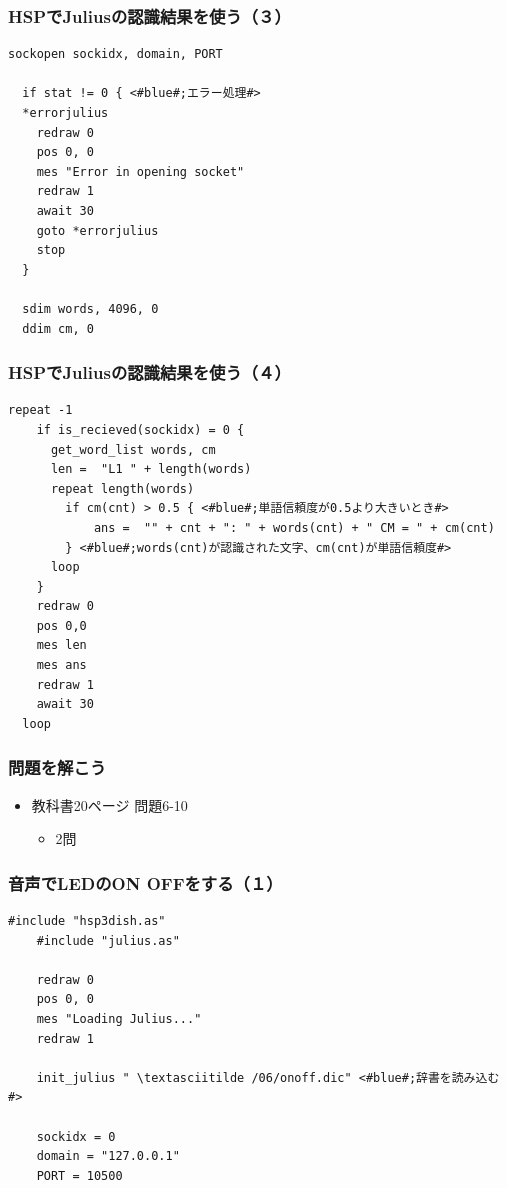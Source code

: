 \documentclass[14pt]{beamer}
\begin{document}
\begin{frame}[fragile]
  \frametitle{HSPでJuliusの認識結果を使う（３）}
  \begin{lstlisting}[caption=julius.hsp,label=julius.hsp]
  sockopen sockidx, domain, PORT

  if stat != 0 { <#blue#;エラー処理#>
  *errorjulius
    redraw 0
    pos 0, 0
    mes "Error in opening socket"
    redraw 1
    await 30
    goto *errorjulius
    stop
  }

  sdim words, 4096, 0
  ddim cm, 0
  \end{lstlisting}
\end{frame}

\begin{frame}[fragile]
  \frametitle{HSPでJuliusの認識結果を使う（４）}
  \begin{lstlisting}[caption=julius.hsp,label=julius.hsp,basicstyle=\scriptsize]
  repeat -1
    if is_recieved(sockidx) = 0 {
      get_word_list words, cm
      len =  "L1 " + length(words)
      repeat length(words)
        if cm(cnt) > 0.5 { <#blue#;単語信頼度が0.5より大きいとき#>
            ans =  "" + cnt + ": " + words(cnt) + " CM = " + cm(cnt)
        } <#blue#;words(cnt)が認識された文字、cm(cnt)が単語信頼度#>
      loop
    }
    redraw 0
    pos 0,0
    mes len
    mes ans
    redraw 1
    await 30
  loop
  \end{lstlisting}
\end{frame}

\begin{frame}
  \frametitle{問題を解こう}
  \begin{itemize}
    \item 教科書20ページ 問題6-10
          \begin{itemize}
            \item 2問
          \end{itemize}
  \end{itemize}
\end{frame}

\begin{frame}[fragile]
  \frametitle{音声でLEDのON OFFをする（１）}
  \begin{lstlisting}[caption=ledvoice.hsp,label=ledvoice.hsp]
    #include "hsp3dish.as"
    #include "julius.as"

    redraw 0
    pos 0, 0
    mes "Loading Julius..."
    redraw 1

    init_julius " \textasciitilde /06/onoff.dic" <#blue#;辞書を読み込む#>

    sockidx = 0
    domain = "127.0.0.1"
    PORT = 10500
  \end{lstlisting}
\end{frame}
\end{document}
